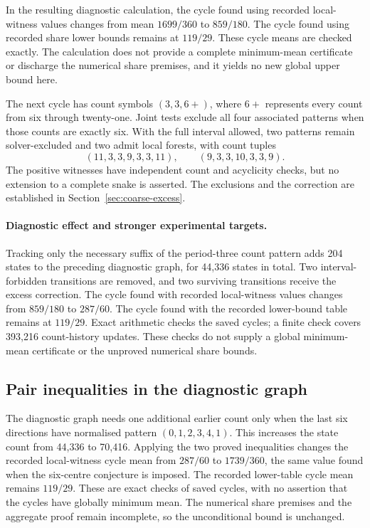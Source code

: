 \documentclass[11pt,a4paper]{article}
\theoremstyle{definition}
\theoremstyle{remark}
\begin{document}
In the resulting diagnostic calculation, the cycle found using recorded local-witness values changes from mean $1699/360$ to $859/180$. The cycle found using recorded share lower bounds remains at $119/29$. These cycle means are checked exactly. The calculation does not provide a complete minimum-mean certificate or discharge the numerical share premises, and it yields no new global upper bound here.

The next cycle has count symbols $(3,3,6+)$, where $6+$ represents every count from six through twenty-one. Joint tests exclude all four associated patterns when those counts are exactly six. With the full interval allowed, two patterns remain solver-excluded and two admit local forests, with count tuples
\[
(11,3,3,9,3,3,11),\qquad (9,3,3,10,3,3,9).
\]
The positive witnesses have independent count and acyclicity checks, but no extension to a complete snake is asserted. The exclusions and the correction are established in Section~\ref{sec:coarse-excess}.

\paragraph{Diagnostic effect and stronger experimental targets.}
Tracking only the necessary suffix of the period-three count pattern adds 204 states to the preceding diagnostic graph, for 44,336 states in total. Two interval-forbidden transitions are removed, and two surviving transitions receive the excess correction. The cycle found with recorded local-witness values changes from $859/180$ to $287/60$. The cycle found with the recorded lower-bound table remains at $119/29$. Exact arithmetic checks the saved cycles; a finite check covers 393,216 count-history updates. These checks do not supply a global minimum-mean certificate or the unproved numerical share bounds.

\subsection{Pair inequalities in the diagnostic graph}
The diagnostic graph needs one additional earlier count only when the last six directions have normalised pattern $(0,1,2,3,4,1)$. This increases the state count from 44,336 to 70,416. Applying the two proved inequalities changes the recorded local-witness cycle mean from $287/60$ to $1739/360$, the same value found when the six-centre conjecture is imposed. The recorded lower-table cycle mean remains $119/29$. These are exact checks of saved cycles, with no assertion that the cycles have globally minimum mean. The numerical share premises and the aggregate proof remain incomplete, so the unconditional bound is unchanged.
\end{document}

